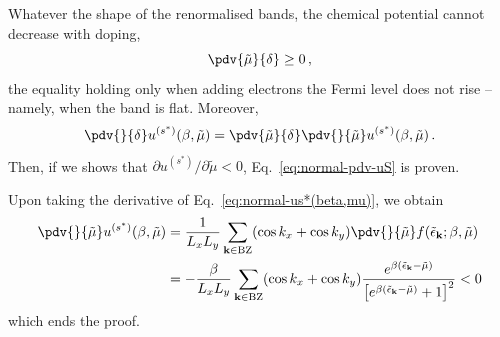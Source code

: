 \begin{tabproof}
	
	Whatever the shape of the renormalised bands, the chemical potential cannot decrease with doping,
	\[
		\pdv{\tilde{\mu}}{\delta} \ge 0 \, ,
	\]
	the equality holding only when adding electrons the Fermi level does not rise -- namely, when the band is flat. Moreover,
	\[
		\pdv{}{\delta} u^{(s^*)}(\beta,\tilde{\mu}) = \pdv{\tilde{\mu}}{\delta}  \pdv{}{\tilde{\mu}} u^{(s^*)}(\beta,\tilde{\mu}) \, .
	\]
	Then, if we shows that $\partial u^{(s^*)} / \partial \tilde{\mu} < 0$, Eq.~\eqref{eq:normal-pdv-uS} is proven.
	
	Upon taking the derivative of Eq.~\eqref{eq:normal-us*(beta,mu)}, we obtain
	\[
	\begin{aligned}
		\pdv{}{\tilde{\mu}} u^{(s^*)}(\beta,\tilde{\mu}) &= \frac{1}{L_x L_y} \sum_{\mathbf{k}\in\mathrm{BZ}} (\cos k_x + \cos k_y) \pdv{}{\tilde{\mu}} f(\tilde{\epsilon}_\mathbf{k};\beta,\tilde{\mu}) \\
		&= -\frac{\beta}{L_x L_y} \sum_{\mathbf{k}\in\mathrm{BZ}} (\cos k_x + \cos k_y) \frac{e^{\beta(\tilde{\epsilon}_\mathbf{k}-\tilde{\mu})}}{\left[e^{\beta(\tilde{\epsilon}_\mathbf{k}-\tilde{\mu})}+1\right]^2} < 0
	\end{aligned}
	\]
	which ends the proof.
	

\end{tabproof}
